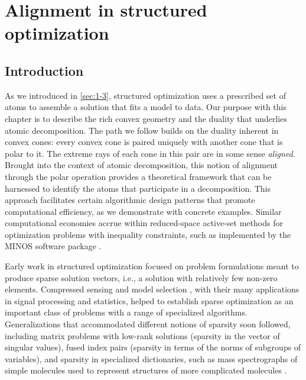 \chapter{Alignment in structured optimization}
\label{ch:Dual-Struc-Opt}

\section{Introduction}
As we introduced in \autoref{sec:1-3}, structured optimization uses a prescribed set of atoms to assemble a solution that fits a model to data. Our purpose with this chapter is to describe the rich convex geometry and the duality that
underlies atomic decomposition. The path we follow builds on the duality
inherent in convex cones: every convex cone is paired uniquely with another cone that is polar to it. The extreme rays of each cone in this pair are in some sense \emph{aligned}. Brought into the context of atomic decomposition, this
notion of alignment through the polar operation provides a theoretical framework
that can be harnessed to identify the atoms that participate in a decomposition. This
approach facilitates certain algorithmic design patterns that promote
computational efficiency, as we demonstrate with concrete examples. Similar
computational economies accrue within reduced-space active-set methods for
optimization problems with inequality constraints, such as implemented by the
MINOS software package \citep{murtsaun:1983}.

Early work in structured optimization focused on problem formulations meant to
produce sparse solution vectors, i.e., a solution with relatively few non-zero
elements. Compressed sensing \cite{cds98,chendonosaun:2001,crt06a} and model
selection \cite{tibshirani1996regression,tibshirani1997lasso} , with their many applications
in signal processing and statistics, helped to establish sparse optimization as
an important class of problems with a range of specialized algorithms.
Generalizations that accommodated different notions of sparsity soon followed,
including matrix problems with low-rank solutions (sparsity in the vector of
singular values), fused index pairs (sparsity in terms of the norms of subgroups of variables), and sparsity in specialized dictionaries, such as mass
spectrographs of simple molecules used to represent structures of
more complicated molecules \cite[Section~6.3.1]{vandenberghe:2010}.

